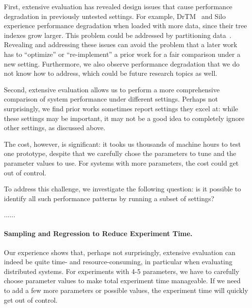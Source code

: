 First, extensive evaluation has revealed design issues that
    cause performance degradation in previously untested settings. For example, DrTM~\cite{Wei2015FIT}
    and Silo experience performance degradation when loaded with
    more data, since their tree indexes grow larger. This problem could be addressed
    by partitioning data~\cite{Kalia2014HERD,chang06bigtable,Decandia07Dynamo,Lee2021ShardManager}.
    Revealing and addressing these issues can avoid
    the problem that a later work has to ``optimize'' or ``re-implement'' a prior work for
    a fair comparison under a new setting. Furthermore, we also observe
    performance degradation that we do not know how to address, which
    could be future research topics as well.
    
Second, extensive evaluation allows us to perform a more comprehensive comparison
    of system performance under different settings. Perhaps
    not surprisingly, we find prior works sometimes report
    settings they excel at: while these settings may be important,
    it may not be a good idea to completely ignore other settings,
    as discussed above.

The cost, however, is significant: it tooks us thousands of machine hours to test
one prototype, despite that we carefully chose the parameters to tune and
 the parameter values to use. For systems with more parameters, the cost
could get out of control.

To address this challenge, we investigate the following question: is it possible
to identify all such performance patterns by running a subset of settings?

......



\iffalse
\vspace{-.1in}
\paragraph{Sampling and Regression to Reduce Experiment Time.}
Our experience shows that, perhaps not surprisingly, extensive
evaluation can indeed be quite  time- and resource-consuming, in particular
when evaluating distributed systems.
For experiments with 4-5 parameters, we have to carefully choose parameter
values to make total experiment time manageable.
If we need to add a few more parameters or
possible values, the experiment time will quickly get out of control. 

